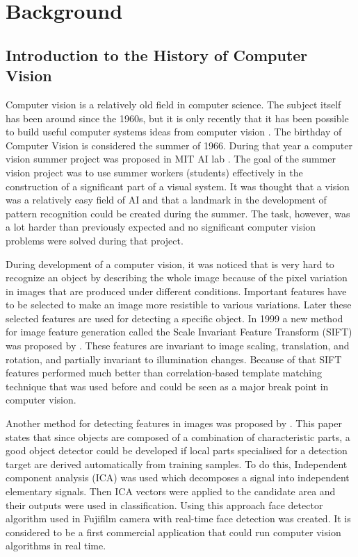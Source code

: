 \chapter{Background}

\section{Introduction to the History of Computer Vision}
\label{sec:intro}


Computer vision is a relatively old field in computer science. The subject itself has been around since the 1960s, but it is only recently that it has been possible to build useful computer systems ideas from computer vision \cite {cv}.
The birthday of Computer Vision is considered the summer of 1966.  During that year a computer vision summer project was proposed in MIT AI lab \citep{papert}. The goal of the summer vision project was to use summer workers (students) effectively in the construction of a significant part of a visual system. It was thought that a vision was a relatively easy field of AI and that a landmark in the development of pattern recognition could be created during the summer. The task, however, was a lot harder than previously expected and no significant computer vision problems were solved during that project.

During development of a computer vision, it was noticed that is very hard to recognize an object by describing the whole image because of the pixel variation in images that are produced under different conditions. Important features have to be selected to make an image more resistible to various variations. Later these selected features are used for detecting a specific object. In 1999 a new method for image feature generation called the Scale Invariant Feature Transform (SIFT) was proposed by \cite{sift}. These features are invariant to image scaling, translation, and rotation, and partially invariant to illumination changes. Because of that SIFT features performed much better than correlation-based template matching technique that was used before and could be seen as a major break point in computer vision.
 
Another method for detecting features in images was proposed by \citep{nakano2006object}. This paper states that since objects are composed of a combination of characteristic parts, a good object detector could be developed if local parts specialised for a detection target are derived automatically from training samples. To do this, Independent component analysis (ICA) was used which decomposes a signal into independent elementary signals. Then ICA vectors were applied to the candidate area and their outputs were used in classification. Using this approach face detector algorithm used in Fujifilm camera with real-time face detection was created. It is considered to be a first commercial application that could run computer vision algorithms in real time. 
 
